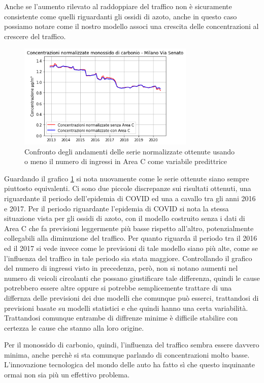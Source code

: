 \documentclass[a4paper,12pt]{report}
\begin{document}
Anche se l'aumento rilevato al raddoppiare del traffico non è sicuramente consistente come quelli riguardanti gli ossidi di azoto, anche in questo caso possiamo notare come il nostro modello associ una crescita delle concentrazioni al crescere del traffico. 

\begin{figure}[h]
\centering
\includegraphics[width=0.75\textwidth]{co_areac}
\caption{Confronto degli andamenti delle serie normalizzate ottenute usando o meno il numero di ingressi in Area C come variabile predittrice}
\label{fig:co_areac}
\end{figure}

Guardando il grafico \ref{fig:co_areac} si nota nuovamente come le serie ottenute siano sempre piuttosto equivalenti. Ci sono due piccole discrepanze sui risultati ottenuti, una riguardante il periodo dell'epidemia di COVID ed una a cavallo tra gli anni 2016 e 2017.
Per il periodo riguardante l'epidemia di COVID si nota la stessa situazione vista per gli ossidi di azoto, con il modello costruito senza i dati di Area C che fa previsioni leggermente più basse rispetto all'altro, potenzialmente collegabili alla diminuzione del traffico. Per quanto riguarda il periodo tra il 2016 ed il 2017 si vede invece come le previsioni di tale modello siano più alte, come se l'influenza del traffico in tale periodo sia stata maggiore. Controllando il grafico del numero di ingressi visto in precedenza, però, non si notano aumenti nel numero di veicoli circolanti che possano giustificare tale differenza, quindi le cause potrebbero essere altre oppure si potrebbe semplicemente trattare di una differnza delle previsioni dei due modelli che comunque può esserci, trattandosi di previsioni basate su modelli statistici e che quindi hanno una certa variabilità.
Trattandosi comunque entrambe di diffrenze minime è difficile stabilire con certezza le cause che stanno alla loro origine.

Per il monossido di carbonio, quindi, l'influenza del traffico sembra essere davvero minima, anche perchè si sta comunque parlando di concentrazioni molto basse. L'innovazione tecnologica del mondo delle auto ha fatto sì che questo inquinante ormai non sia più un effettivo problema.
\end{document}

